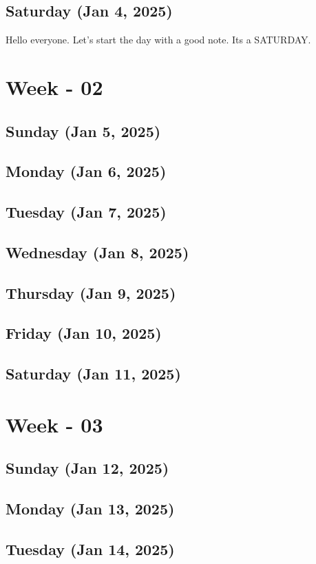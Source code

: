 \subsection*{Saturday (Jan 4, 2025)}
Hello everyone. Let's start the day with a good note. Its a SATURDAY.
\section{Week - 02}
\subsection*{Sunday (Jan 5, 2025)}
\subsection*{Monday (Jan 6, 2025)}
\subsection*{Tuesday (Jan 7, 2025)}
\subsection*{Wednesday (Jan 8, 2025)}
\subsection*{Thursday (Jan 9, 2025)}
\subsection*{Friday (Jan 10, 2025)}
\subsection*{Saturday (Jan 11, 2025)}

\section{Week - 03}
\subsection*{Sunday (Jan 12, 2025)}
\subsection*{Monday (Jan 13, 2025)}
\subsection*{Tuesday (Jan 14, 2025)}
